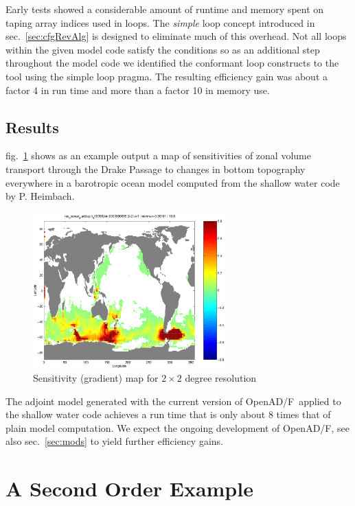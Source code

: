 \documentclass{book}
\newcommand{\OpenADF}{OpenAD/F}
\newcommand{\refsec}[1]{{sec.~\ref{#1}}}
\newcommand{\reffig}[1]{{fig.~\ref{#1}}}
\begin{document}
Early tests showed a considerable amount of runtime and memory 
spent on taping array indices used in loops. 
The {\em simple} loop concept introduced in \refsec{sec:cfgRevAlg}
is designed to eliminate much of this overhead. 
Not all loops within the given model code satisfy the conditions 
so as an additional step throughout the model code 
we identified the conformant loop constructs to 
the tool using the simple loop pragma. The resulting efficiency gain
was about a factor 4 in run time and more than a factor 10 in memory 
use.

\subsection{Results}
\reffig{fig:sensMap} shows as an example output a map of sensitivities of 
zonal volume transport through the Drake Passage 
to changes in bottom topography everywhere in a barotropic ocean model 
computed from the shallow water code by P. Heimbach.
\begin{figure}
\begin{center}
\includegraphics[height=6cm]{sensMap}
\end{center}
\caption{Sensitivity (gradient) map for $2\times 2$ degree resolution}\label{fig:sensMap}
\end{figure} 
The adjoint model generated with the current version of \OpenADF\ applied to the 
shallow water code achieves 
a run time that is only about 8 times that of  plain model computation.
We expect the ongoing development of \OpenADF, see also \refsec{sec:mods} to yield 
further efficiency gains.

\section{A Second Order Example}
\end{document}
